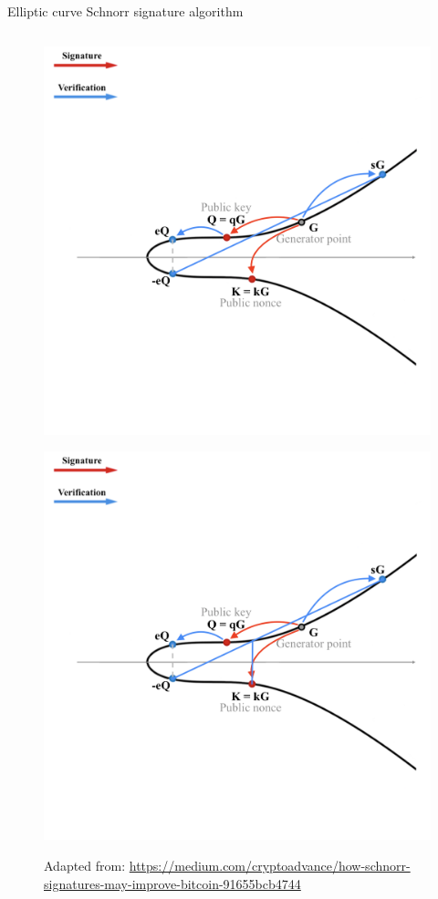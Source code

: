 \documentclass[slidescentered]{beamer}
\newcommand{\source}[1]{\caption*{\tiny Adapted from: {#1}} }
\begin{document}
\begin{frame}{Elliptic curve Schnorr signature algorithm}
\begin{columns}
\begin{column}{0.5\linewidth}
\begin{figure}
{						\source{\tiny \url{https://medium.com/cryptoadvance/how-schnorr-signatures-may-improve-bitcoin-91655bcb4744}}}
					 {\vspace*{-0.7cm}
						\hspace*{-0.9cm}
						\includegraphics[scale=0.28]{images/Schnorr7}
						\source{\tiny \url{https://medium.com/cryptoadvance/how-schnorr-signatures-may-improve-bitcoin-91655bcb4744}}}
					 {\vspace*{-0.7cm}
						\hspace*{-0.9cm}
						\includegraphics[scale=0.28]{images/Schnorr8}
}
\end{figure}
\end{column}
\end{columns}
\end{frame}
\end{document}
